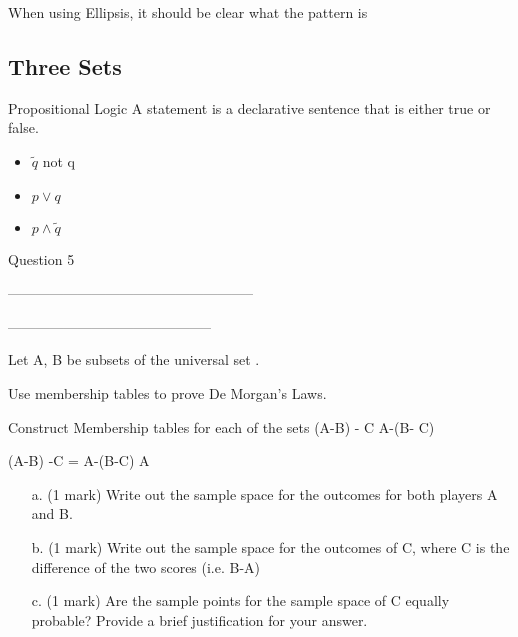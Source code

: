 {{{When using Ellipsis, it should be clear what the pattern is













\subsection*{ Three Sets }






Propositional Logic A statement is a declarative sentence that
is either true or false.
\begin{itemize}
\item $\tilde q$ not q \item $p \vee q$ \item $p \wedge \tilde
q$
\end{itemize}




Question 5

-----------------------------------------------------


--------------------------------------------

Let A, B be subsets of the universal set .

Use membership tables to prove De Morgan's Laws.



Construct Membership tables for each of the sets
(A-B) - C
A-(B- C)

(A-B) -C = A-(B-C)
A



\begin{itemize}
\item[a.] (1 mark) Write out the sample space for the outcomes for both players A and B.
\item[b.] (1 mark) Write out the sample space for the outcomes of C, where C is the difference of the two scores (i.e. B-A)
\item[c.] (1 mark) Are the sample points for the sample space of C equally probable? Provide a brief justification for your answer.
\end{itemize}

}}}
